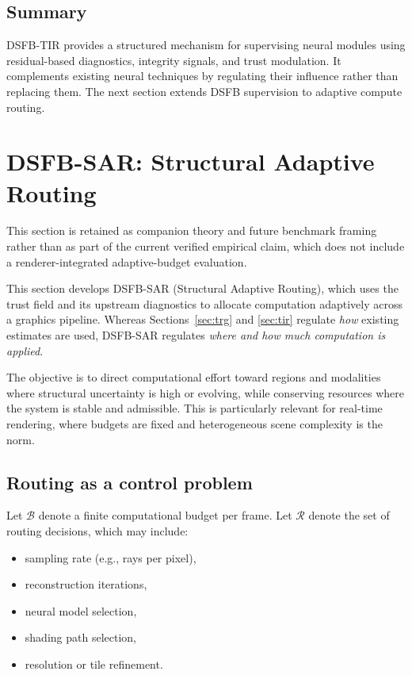 \documentclass[11pt,letterpaper]{article}
\theoremstyle{gcresult}
\theoremstyle{definition}
\begin{document}

\subsection{Summary}

DSFB-TIR provides a structured mechanism for supervising neural modules using residual-based diagnostics, integrity signals, and trust modulation. It complements existing neural techniques by regulating their influence rather than replacing them. The next section extends DSFB supervision to adaptive compute routing.


\section{DSFB-SAR: Structural Adaptive Routing}

This section is retained as companion theory and future benchmark framing rather than as part of the current verified empirical claim, which does not include a renderer-integrated adaptive-budget evaluation.
\label{sec:sar}

This section develops DSFB-SAR (Structural Adaptive Routing), which uses the trust field and its upstream diagnostics to allocate computation adaptively across a graphics pipeline. Whereas Sections~\ref{sec:trg} and \ref{sec:tir} regulate \emph{how} existing estimates are used, DSFB-SAR regulates \emph{where and how much computation is applied}.

The objective is to direct computational effort toward regions and modalities where structural uncertainty is high or evolving, while conserving resources where the system is stable and admissible. This is particularly relevant for real-time rendering, where budgets are fixed and heterogeneous scene complexity is the norm.


\subsection{Routing as a control problem}

Let $\mathcal{B}$ denote a finite computational budget per frame. Let $\mathcal{R}$ denote the set of routing decisions, which may include:
\begin{itemize}[leftmargin=1.5em]
    \item sampling rate (e.g., rays per pixel),
    \item reconstruction iterations,
    \item neural model selection,
    \item shading path selection,
    \item resolution or tile refinement.
\end{itemize}
\end{document}
